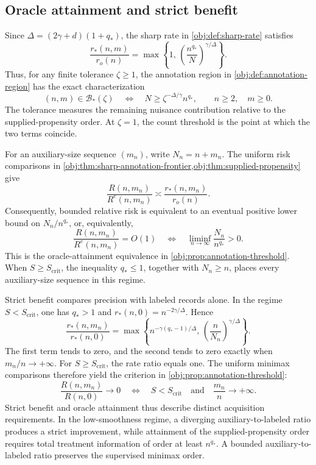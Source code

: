 \documentclass[11pt]{article}
\begin{document}
\subsection{Oracle attainment and strict benefit}

Since \(\Delta=(2\gamma+d)(1+q_*)\), the sharp rate in \cref{obj:def:sharp-rate} satisfies
\[
\frac{r_*(n,m)}{r_o(n)}
=
\max\left\{
1,\,
\left(\frac{n^{q_*}}{N}\right)^{\gamma/\Delta}
\right\}.
\]
Thus, for any finite tolerance \(\zeta\ge1\), the annotation region in \cref{obj:def:annotation-region} has the exact characterization
\[
(n,m)\in\mathcal B_*(\zeta)
\quad\Longleftrightarrow\quad
N\ge \zeta^{-\Delta/\gamma}n^{q_*},
\qquad n\ge2,\quad m\ge0.
\]
The tolerance measures the remaining nuisance contribution relative to the supplied-propensity order. At \(\zeta=1\), the count threshold is the point at which the two terms coincide.

For an auxiliary-size sequence \((m_n)\), write \(N_n=n+m_n\). The uniform risk comparisons in \cref{obj:thm:sharp-annotation-frontier,obj:thm:supplied-propensity} give
\[
\frac{R(n,m_n)}{R^e(n,m_n)}
\asymp
\frac{r_*(n,m_n)}{r_o(n)}.
\]
Consequently, bounded relative risk is equivalent to an eventual positive lower bound on \(N_n/n^{q_*}\), or, equivalently,
\[
\frac{R(n,m_n)}{R^e(n,m_n)}=O(1)
\quad\Longleftrightarrow\quad
\liminf_{n\to\infty}\frac{N_n}{n^{q_*}}>0.
\]
This is the oracle-attainment equivalence in \cref{obj:prop:annotation-threshold}. When \(S\ge S_{\mathrm{crit}}\), the inequality \(q_*\le1\), together with \(N_n\ge n\), places every auxiliary-size sequence in this regime.

Strict benefit compares precision with labeled records alone. In the regime \(S<S_{\mathrm{crit}}\), one has \(q_*>1\) and \(r_*(n,0)=n^{-2\gamma/\Delta}\). Hence
\[
\frac{r_*(n,m_n)}{r_*(n,0)}
=
\max\left\{
n^{-\gamma(q_*-1)/\Delta},\,
\left(\frac{n}{N_n}\right)^{\gamma/\Delta}
\right\}.
\]
The first term tends to zero, and the second tends to zero exactly when \(m_n/n\to+\infty\). For \(S\ge S_{\mathrm{crit}}\), the rate ratio equals one. The uniform minimax comparisons therefore yield the criterion in \cref{obj:prop:annotation-threshold}:
\[
\frac{R(n,m_n)}{R(n,0)}\longrightarrow0
\quad\Longleftrightarrow\quad
S<S_{\mathrm{crit}}
\quad\text{and}\quad
\frac{m_n}{n}\longrightarrow+\infty.
\]
Strict benefit and oracle attainment thus describe distinct acquisition requirements. In the low-smoothness regime, a diverging auxiliary-to-labeled ratio produces a strict improvement, while attainment of the supplied-propensity order requires total treatment information of order at least \(n^{q_*}\). A bounded auxiliary-to-labeled ratio preserves the supervised minimax order.
\end{document}
